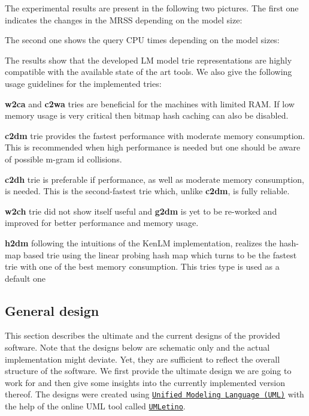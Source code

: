 The experimental results are present in the following two pictures. The first one indicates the changes in the M\+R\+S\+S depending on the model size\+:



The second one shows the query C\+P\+U times depending on the model sizes\+:



The results show that the developed L\+M model trie representations are highly compatible with the available state of the art tools. We also give the following usage guidelines for the implemented tries\+:


\begin{DoxyItemize}
\item {\bfseries w2ca} and {\bfseries c2wa} tries are beneficial for the machines with limited R\+A\+M. If low memory usage is very critical then bitmap hash caching can also be disabled.
\item {\bfseries c2dm} trie provides the fastest performance with moderate memory consumption. This is recommended when high performance is needed but one should be aware of possible m-\/gram id collisions.
\item {\bfseries c2dh} trie is preferable if performance, as well as moderate memory consumption, is needed. This is the second-\/fastest trie which, unlike {\bfseries c2dm}, is fully reliable.
\item {\bfseries w2ch} trie did not show itself useful and {\bfseries g2dm} is yet to be re-\/worked and improved for better performance and memory usage.
\item {\bfseries h2dm} following the intuitions of the Ken\+L\+M implementation, realizes the hash-\/map based trie using the linear probing hash map which turns to be the fastest trie with one of the best memory consumption. This tries type is used as a default one
\end{DoxyItemize}

\subsection*{General design}

This section describes the ultimate and the current designs of the provided software. Note that the designs below are schematic only and the actual implementation might deviate. Yet, they are sufficient to reflect the overall structure of the software. We first provide the ultimate design we are going to work for and then give some insights into the currently implemented version thereof. The designs were created using \href{http://www.uml.org/}{\tt Unified Modeling Language (U\+M\+L)} with the help of the online U\+M\+L tool called \href{http://www.umletino.com/}{\tt U\+M\+Letino}.

